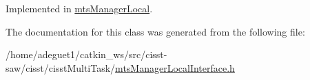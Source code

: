 Implemented in \hyperlink{classmts_manager_local_ac58e53b7cb5f77daf8cdcfb6cc0d0e1e}{mts\-Manager\-Local}.



The documentation for this class was generated from the following file\-:\begin{DoxyCompactItemize}
\item 
/home/adeguet1/catkin\-\_\-ws/src/cisst-\/saw/cisst/cisst\-Multi\-Task/\hyperlink{mts_manager_local_interface_8h}{mts\-Manager\-Local\-Interface.\-h}\end{DoxyCompactItemize}
